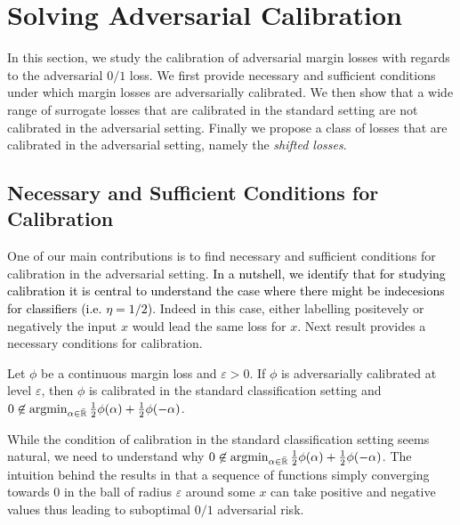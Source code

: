 \section{Solving Adversarial Calibration}
\label{sec:calibration}
In this section,  we study the calibration of adversarial margin losses with regards to the adversarial $0/1$ loss. We first provide necessary and sufficient conditions under which margin losses are adversarially calibrated. We then show that a wide range of surrogate losses that are calibrated in the standard setting are not calibrated in the adversarial setting. Finally we propose a class of losses that are calibrated in the adversarial setting, namely the \emph{shifted losses}.

\subsection{Necessary and Sufficient Conditions for Calibration}

One of our main contributions is to find necessary and sufficient conditions for calibration in the adversarial setting. \textcolor{black}{In a nutshell, we identify that for studying calibration it is central to understand  the case where there might be indecesions for classifiers (i.e. $\eta=1/2$)}. Indeed in this case, either labelling positevely or negatively the input $x$ would lead the same loss for $x$. Next result provides a necessary conditions for calibration. 

\begin{thm} 
\label{thm:calibration}
Let $\phi$  be a continuous margin loss and $\varepsilon>0$. If $\phi$ is adversarially  calibrated at level $\varepsilon$, then $\phi$ is  calibrated in the standard classification setting and $0\not\in \operatorname*{argmin}_{\alpha\in\bar{\mathbb{R}}}
\frac12\phi(\alpha)+\frac12\phi(-\alpha)$. 
\end{thm}

While the condition of calibration in the standard classification setting seems natural, we need to understand why $0\not\in \operatorname*{argmin}_{\alpha\in\bar{\mathbb{R}}}
\frac12\phi(\alpha)+\frac12\phi(-\alpha)$. The intuition behind the results in that a sequence of functions simply converging towards $0$ in the ball of radius $\varepsilon$ around some $x$ can take positive and negative values thus leading to suboptimal $0/1$ adversarial risk. 

